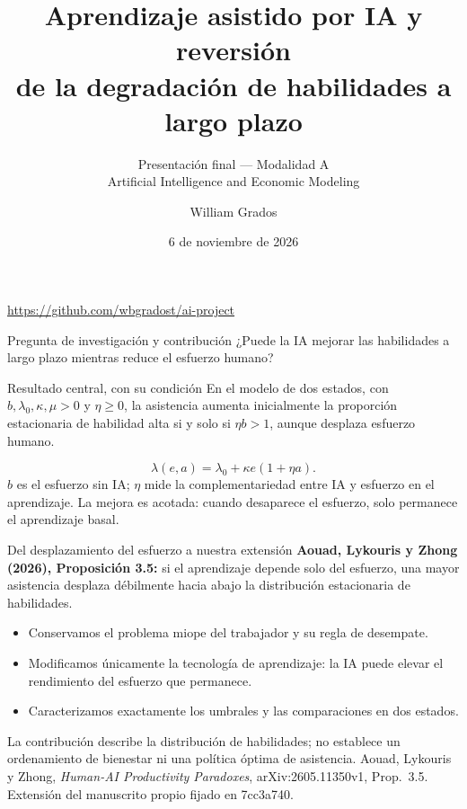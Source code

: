 \documentclass[aspectratio=169,11pt]{beamer}
\title{Aprendizaje asistido por IA y reversión\\de la degradación de habilidades a largo plazo}
\subtitle{Presentación final --- Modalidad A\\Artificial Intelligence and Economic Modeling}
\author{William Grados}
\date{6 de noviembre de 2026}
\newcommand{\source}[1]{\vfill{\tiny\color{black!60}#1}}
\begin{document}
\begin{frame}[plain]
  \titlepage
  \begin{center}\small\url{https://github.com/wbgradost/ai-project}\end{center}
\end{frame}

\begin{frame}{Pregunta de investigación y contribución}
  ¿Puede la IA mejorar las habilidades a largo plazo mientras reduce el esfuerzo humano?
  \par\medskip
  \begin{block}{Resultado central, con su condición}
  En el modelo de dos estados, con $b,\lambda_0,\kappa,\mu>0$ y $\eta\geq0$,
  la asistencia aumenta inicialmente la proporción estacionaria de habilidad alta
  \alert{si y solo si $\eta b>1$}, aunque desplaza esfuerzo humano.
  \end{block}
  \[
    \lambda(e,a)=\lambda_0+\kappa e(1+\eta a).
  \]
  $b$ es el esfuerzo sin IA; $\eta$ mide la complementariedad entre IA y esfuerzo
  en el aprendizaje. La mejora es acotada: cuando desaparece el esfuerzo,
  solo permanece el aprendizaje basal.
\end{frame}

\begin{frame}{Del desplazamiento del esfuerzo a nuestra extensión}
  \textbf{Aouad, Lykouris y Zhong (2026), Proposición 3.5:}
  si el aprendizaje depende solo del esfuerzo, una mayor asistencia desplaza
  débilmente hacia abajo la distribución estacionaria de habilidades.
  \par\medskip
  \begin{itemize}
    \item Conservamos el problema miope del trabajador y su regla de desempate.
    \item Modificamos únicamente la tecnología de aprendizaje: la IA puede
    elevar el rendimiento del esfuerzo que permanece.
    \item Caracterizamos exactamente los umbrales y las comparaciones en dos estados.
  \end{itemize}
  \par\medskip
  La contribución describe la distribución de habilidades; no establece un
  ordenamiento de bienestar ni una política óptima de asistencia.
  \source{Aouad, Lykouris y Zhong, \textit{Human-AI Productivity Paradoxes},
  arXiv:2605.11350v1, Prop.~3.5. Extensión del manuscrito propio fijado en 7cc3a740.}
\end{frame}
\end{document}
